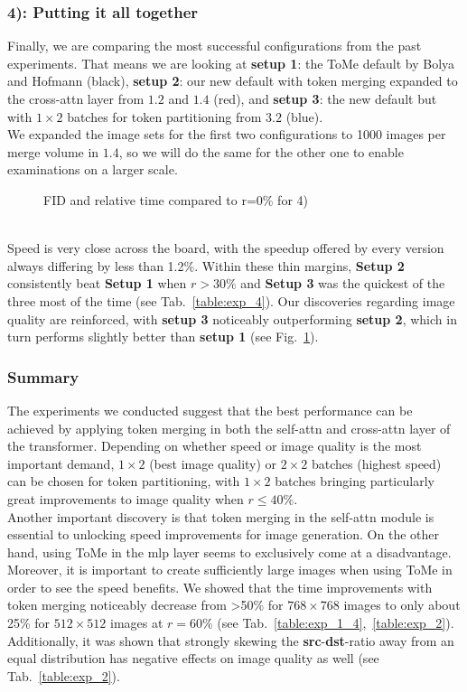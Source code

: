 \subsubsection*{4): Putting it all together}
Finally, we are comparing the most successful configurations from the past experiments. That means we are looking at \textbf{setup 1}: the ToMe default by Bolya and Hofmann (black), \textbf{setup 2}: our new default with token merging expanded to the cross-attn layer from \(1.2\) and \(1.4\) (red), and \textbf{setup 3}: the new default but with $1 \times 2$ batches for token partitioning from \(3.2\) (blue).\\
We expanded the image sets for the first two configurations to 1000 images per merge volume in \(1.4\), so we will do the same for the other one to enable examinations on a larger scale.
\begin{figure}[!htb]
    
    
\caption{FID and relative time compared to r=0\% for 4)}
\label{fig:exp_4}
\end{figure}\\
Speed is very close across the board, with the speedup offered by every version always differing by less than 1.2\%. Within these thin margins, \textbf{Setup 2} consistently beat \textbf{Setup 1} when \(r>30\%\) and \textbf{Setup 3} was the quickest of the three most of the time (see Tab.~\ref{table:exp_4}).
Our discoveries regarding image quality are reinforced, with \textbf{setup 3} noticeably outperforming \textbf{setup 2}, which in turn performs slightly better than \textbf{setup 1} (see Fig.~\ref{fig:exp_4}).\\



\subsubsection*{Summary}
The experiments we conducted suggest that the best performance can be achieved by applying token merging in both the self-attn and cross-attn layer of the transformer. Depending on whether speed or image quality is the most important demand, $1 \times 2$ (best image quality) or $2 \times 2$ batches (highest speed) can be chosen for token partitioning, with $1 \times 2$ batches bringing particularly great improvements to image quality when \(r\leq40\%\).\\
Another important discovery is that token merging in the self-attn module is essential to unlocking speed improvements for image generation. On the other hand, using ToMe in the mlp layer seems to exclusively come at a disadvantage.\\
Moreover, it is important to create sufficiently large images when using ToMe in order to see the speed benefits. We showed that the time improvements with token merging noticeably decrease from >50\% for $768 \times 768$ images to only about 25\% for $512 \times 512$ images at \(r=60\%\) (see Tab.~\ref{table:exp_1_4},~\ref{table:exp_2}).\\
Additionally, it was shown that strongly skewing the \textbf{src}-\textbf{dst}-ratio away from an equal distribution has negative effects on image quality as well (see Tab.~\ref{table:exp_2}).
